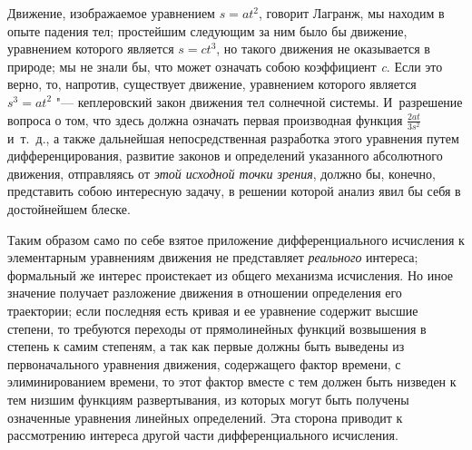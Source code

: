 Движение, изображаемое уравнением $s=at^2$, говорит Лагранж, мы находим в
опыте падения тел; простейшим следующим за ним было бы движение, уравнением
которого является $s=ct^3$, но такого движения не оказывается в природе;
мы не знали бы, что может означать собою коэффициент
{\em c}. Если это верно, то, напротив, существует
движение, уравнением которого является $s^3=at^2$ "--- кеплеровский закон
движения тел солнечной системы. И~разрешение вопроса о том, что здесь
должна означать первая производная функция $\frac{2at}{3s^2}$ 
и~т.~д., а также дальнейшая непосредственная разработка этого уравнения
путем дифференцирования, развитие законов и определений указанного
абсолютного движения, отправляясь от {\em этой исходной
точки зрения}, должно бы, конечно, представить собою интересную задачу, в
решении которой анализ явил бы себя в достойнейшем блеске.

Таким образом само по себе взятое приложение дифференциального исчисления к
элементарным уравнениям движения не представляет
{\em реального} интереса; формальный же интерес
проистекает из общего механизма исчисления. Но иное значение получает
разложение движения в отношении определения его траектории; если последняя
есть кривая и ее уравнение содержит высшие степени, то требуются переходы
от прямолинейных функций возвышения в степень к самим степеням, а так как
первые должны быть выведены из первоначального уравнения движения,
содержащего фактор времени, с элиминированием времени, то этот фактор
вместе с тем должен быть низведен к тем низшим функциям развертывания, из
которых могут быть получены означенные уравнения линейных определений. Эта
сторона приводит к рассмотрению интереса другой части дифференциального
исчисления.

